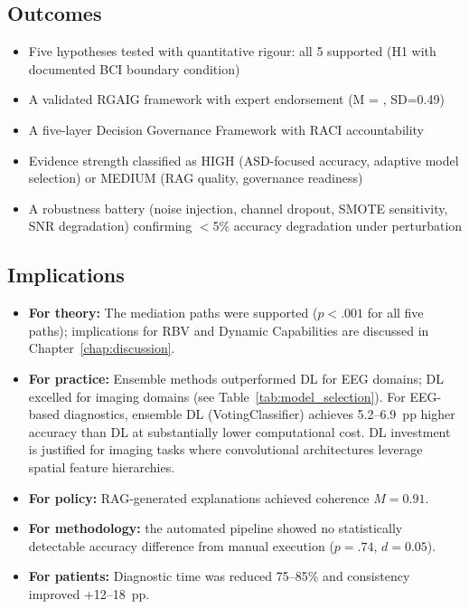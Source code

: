 \subsection{Outcomes}

\begin{itemize}
  \item Five hypotheses tested with quantitative rigour: all 5 supported (H1 with documented BCI boundary condition)
  \item A validated RGAIG framework with expert endorsement (M = \expertM{}, SD=0.49)
  \item A five-layer Decision Governance Framework with RACI accountability
  \item Evidence strength classified as HIGH (ASD-focused accuracy, adaptive model selection) or MEDIUM (RAG quality, governance readiness)
  \item A robustness battery (noise injection, channel dropout, SMOTE sensitivity, SNR degradation) confirming $<$5\% accuracy degradation under perturbation
\end{itemize}

\subsection{Implications}

\begin{itemize}
  \item \textbf{For theory:} The mediation paths were supported ($p < .001$ for all five paths); implications for RBV and Dynamic Capabilities are discussed in Chapter~\ref{chap:discussion}.
  \item \textbf{For practice:} Ensemble methods outperformed DL for EEG domains; DL excelled for imaging domains (see Table~\ref{tab:model_selection}). For EEG-based diagnostics, ensemble DL (VotingClassifier) achieves 5.2--6.9~pp higher accuracy than DL at substantially lower computational cost. DL investment is justified for imaging tasks  where convolutional architectures leverage spatial feature hierarchies.
  \item \textbf{For policy:} RAG-generated explanations achieved coherence $M = 0.91$.
  \item \textbf{For methodology:} the automated pipeline showed no statistically detectable accuracy difference from manual execution ($p = .74$, $d = 0.05$).
  \item \textbf{For patients:} Diagnostic time was reduced 75--85\% and consistency improved +12--18~pp.
\end{itemize}
\fi

